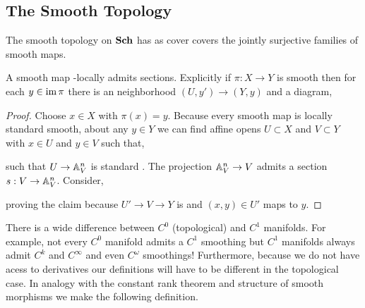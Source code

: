 \documentclass[12pt]{article}
\begin{document}
\subsection{The Smooth Topology}

\begin{defn}
The smooth topology on $\mathbf{Sch}$ has as cover covers the jointly surjective families of smooth maps.
\end{defn}

\begin{lemma}
A smooth map \etale-locally admits sections. Explicitly if $\pi : X \to Y$ is smooth then for each $y \in \operatorname{\mathrm{im}}{\pi}$ there is an \etale neighborhood $(U, y') \to (Y, y)$ and a diagram,
\begin{center}
\end{center}
\end{lemma}

\begin{proof}
Choose $x \in X$ with $\pi(x) = y$. Because every smooth map is locally standard smooth, about any $y \in Y$  we can find affine opens $U \subset X$ and $V \subset Y$ with $x \in U$ and $y \in V$ such that,
\begin{center}
\end{center}
such that $U \to \mathbb{A}^n_V$ is standard \etale. The projection $\mathbb{A}^n_V \to V$ admits a section $s : V \to \mathbb{A}^n_V$. Consider, 
\begin{center}
\end{center}
proving the claim because $U' \to V \to Y$ is \etale and $(x, y) \in U'$ maps to $y$. 
\end{proof}

\begin{rmk}
There is a wide difference between $C^0$ (topological) and $C^1$ manifolds. For example, not every $C^0$ manifold admits a $C^1$ smoothing but $C^1$ manifolds always admit $C^k$ and $C^\infty$ and even $C^\omega$ smoothings! Furthermore, because we do not have acess to derivatives our definitions will have to be different in the topological case. In analogy with the constant rank theorem and structure of smooth morphisms we make the following definition. 
\end{rmk}
\end{document}

